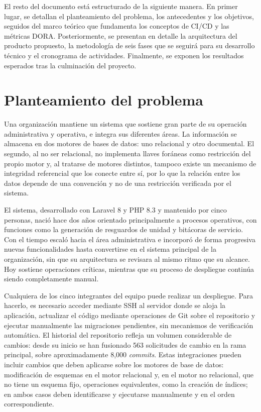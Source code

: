 El resto del documento está estructurado de la siguiente manera. En primer lugar, se detallan el planteamiento del problema, los antecedentes y los objetivos, seguidos del marco teórico que fundamenta los conceptos de CI/CD y las métricas DORA. Posteriormente, se presentan en detalle la arquitectura del producto propuesto, la metodología de seis fases que se seguirá para su desarrollo técnico y el cronograma de actividades. Finalmente, se exponen los resultados esperados tras la culminación del proyecto.

\newpage

\section{Planteamiento del problema}
Una organización mantiene un sistema que sostiene gran parte de su
operación administrativa y operativa, e integra sus diferentes áreas. La información
se almacena en dos motores de bases de datos: uno relacional y otro documental. El segundo, al no ser relacional,
no implementa llaves foráneas como restricción del propio motor y, al tratarse de motores distintos, tampoco
existe un mecanismo de integridad referencial que los conecte entre sí, por lo que la relación entre los datos
depende de una convención y no de una restricción verificada por el sistema.

El sistema, desarrollado con Laravel 8 y PHP 8.3 y mantenido por cinco personas, nació hace dos años orientado
principalmente a procesos operativos, con funciones como la generación de resguardos de unidad y
bitácoras de servicio. Con el tiempo escaló hacia el área administrativa e incorporó
de forma progresiva nuevas funcionalidades hasta
convertirse en el sistema principal de la organización, sin que su arquitectura se revisara al mismo ritmo
que su alcance. Hoy sostiene operaciones críticas, mientras que su
proceso de despliegue continúa siendo completamente manual.

Cualquiera de los cinco integrantes del equipo puede realizar un despliegue. Para hacerlo, es necesario
acceder mediante SSH al servidor donde se aloja la
aplicación, actualizar el código mediante operaciones de Git sobre el repositorio y ejecutar
manualmente las migraciones pendientes, sin mecanismos
de verificación automática. El historial del repositorio refleja un volumen considerable de
cambios: desde su inicio se han fusionado 563 solicitudes de cambio en la rama principal, sobre
aproximadamente 8,000 \emph{commits}. Estas integraciones pueden incluir cambios que deben aplicarse
sobre los motores de base de datos: modificación de esquemas en el motor relacional y, en el
motor no relacional, que no tiene un esquema fijo, operaciones equivalentes, como la creación de
índices; en ambos casos deben identificarse y ejecutarse manualmente y en el orden correspondiente.

